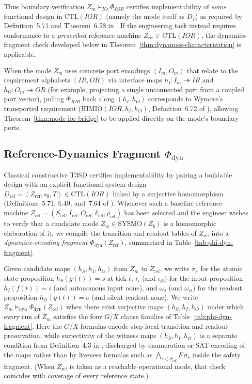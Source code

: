 Thus boundary verification $Z_m\models_{IO}\Phi_{IOR}$ certifies implementability of \emph{some} functional design in $\mathrm{CTL}(IOR)$ (namely the mode itself as $D_f$) as required by Definition~5.71 and Theorem~6.58 in \citet{Wymore1993}. If the engineering task instead requires conformance to a \emph{prescribed} reference machine $Z_{\mathrm{ref}}\in\mathrm{CTL}(IOR)$, the dynamics-fragment check developed below in Theorem~\ref{thm:dynamics-characterization} is applicable.

When the mode $Z_m$ uses concrete port encodings $(I_m,O_m)$ that relate to the requirement alphabets $(IR,OR)$ via interface maps $h_I:I_m\twoheadrightarrow IR$ and $h_O:O_m\twoheadrightarrow OR$ (for example, projecting a single unconnected port from a coupled port vector), pulling $\Phi_{IOR}$ back along $(h_I,h_O)$ corresponds to Wymore's transported requirement ($\mathrm{HIMIO}(IOR,h_I,h_O)$, Definition~6.72 of \citet{Wymore1993}), allowing Theorem~\ref{thm:mode-ior-bridge} to be applied directly on the mode's boundary ports.

\subsection{Reference-Dynamics Fragment \texorpdfstring{$\Phi_{\mathrm{dyn}}$}{Phi\_dyn}}
\label{sec:dynamics-encoding-fragment}
Classical constructive T3SD certifies implementability by pairing a buildable design with an explicit functional system design $D_{\mathrm{ref}}=(Z_{\mathrm{ref}},s_0,T)\in\mathrm{CTL}(IOR)$ linked by a surjective homomorphism (Definitions~5.71, 6.40, and~7.64 of \citet{Wymore1993}). Whenever such a baseline reference machine $Z_{\mathrm{ref}}=(S_{\mathrm{ref}},I_{\mathrm{ref}},O_{\mathrm{ref}},\delta_{\mathrm{ref}},\rho_{\mathrm{ref}})$ has been selected and the engineer wishes to verify that a candidate mode $Z_m\in\mathrm{SYSMO}(Z_b)$ is a homomorphic elaboration of it, we compile the transition and readout tables of $Z_{\mathrm{ref}}$ into a \emph{dynamics-encoding fragment} $\Phi_{\mathrm{dyn}}(Z_{\mathrm{ref}})$, summarized in Table~\ref{tab:phi-dyn-fragment}.

Given candidate maps $(h_S,h_I,h_O)$ from $Z_m$ to $Z_{\mathrm{ref}}$, we write $\sigma_s$ for the atomic state proposition $h_S(g(t))=s$ at tick $t$, $\iota_i$ (and $\iota_\varnothing$) for the input proposition $h_I(f(t))=i$ (and autonomous input $\mathrm{none}$), and $\omega_o$ (and $\omega_\varnothing$) for the readout proposition $h_O(y(t))=o$ (and silent readout $\mathrm{none}$). We write $Z_m\models_{\mathrm{dyn}}\Phi_{\mathrm{dyn}}(Z_{\mathrm{ref}})$ when there exist surjective maps $(h_S,h_I,h_O)$ under which every run of $Z_m$ satisfies the four $G$/$X$ clause families of Table~\ref{tab:phi-dyn-fragment}. Here the $G$/$X$ formulas encode step-local transition and readout preservation, while surjectivity of the witness maps $(h_S,h_I,h_O)$ is a separate condition from Definition~4.3 in \citet{Wymore1993}, discharged by enumeration or SAT encoding of the maps rather than by liveness formulas such as $\bigwedge_{s\in S_{\mathrm{ref}}}F\,\sigma_s$ inside the safety fragment. (When $Z_{\mathrm{ref}}$ is taken as a reachable operational mode, that check coincides with coverage of every reference state.)

